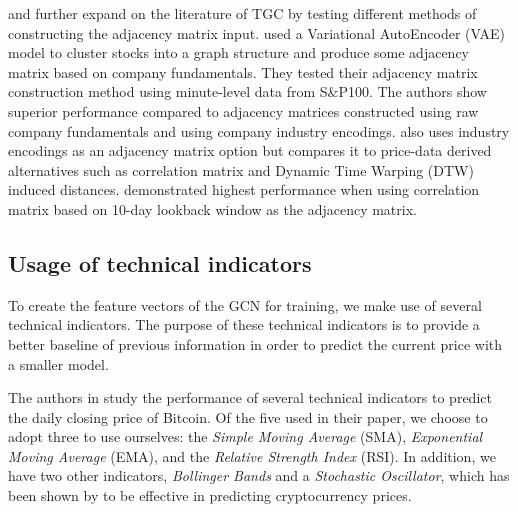 \cite{Hou2021} and \cite{Peng2021} further expand on the literature of TGC by testing different methods of constructing the adjacency matrix input. \cite{Hou2021} used a Variational AutoEncoder (VAE) model to cluster stocks into a graph structure and produce some adjacency matrix based on company fundamentals. They tested their adjacency matrix construction method using minute-level data from S\&P100. The authors show superior performance compared to adjacency matrices constructed using raw company fundamentals and using company industry encodings. \cite{Peng2021} also uses industry encodings as an adjacency matrix option but compares it to price-data derived alternatives such as correlation matrix and Dynamic Time Warping (DTW) induced distances. \citeauthor{Peng2021} demonstrated highest performance when using correlation matrix based on 10-day lookback window as the adjacency matrix.

\subsection{Usage of technical indicators}

To create the feature vectors of the GCN for training, we make use of several technical indicators. The purpose of these technical indicators is to provide a better baseline of previous information in order to predict the current price with a smaller model.

The authors in \cite{Cocco2021} study the performance of several technical indicators to predict the daily closing price of Bitcoin. Of the five used in their paper, we choose to adopt three to use ourselves: the \textit{Simple Moving Average} (SMA), \textit{Exponential Moving Average} (EMA), and the \textit{Relative Strength Index} (RSI). In addition, we have two other indicators, \textit{Bollinger Bands} and a \textit{Stochastic Oscillator}, which has been shown by \cite{Huang2019} to be effective in predicting cryptocurrency prices. 


